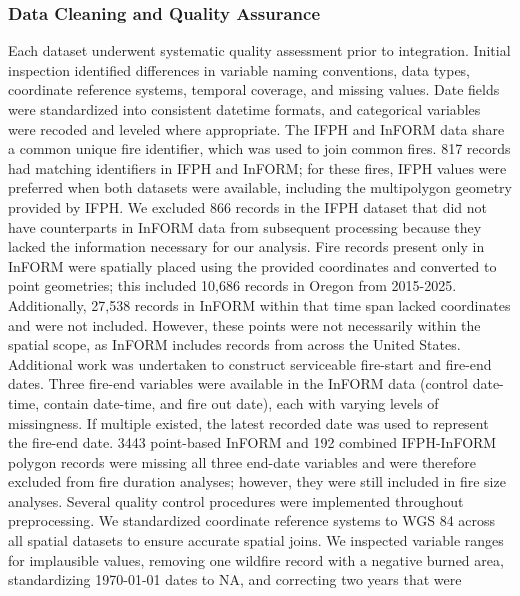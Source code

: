 \documentclass[
  letterpaper,
  DIV=11,
  numbers=noendperiod]{scrartcl}
\begin{document}
\subsubsection{Data Cleaning and Quality
Assurance}\label{data-cleaning-and-quality-assurance}

Each dataset underwent systematic quality assessment prior to
integration. Initial inspection identified differences in variable
naming conventions, data types, coordinate reference systems, temporal
coverage, and missing values. Date fields were standardized into
consistent datetime formats, and categorical variables were recoded and
leveled where appropriate. \hspace{0pt} The IFPH and InFORM data share a
common unique fire identifier, which was used to join common fires. 817
records had matching identifiers in IFPH and InFORM; for these fires,
IFPH values were preferred when both datasets were available, including
the multipolygon geometry provided by IFPH. We excluded 866 records in
the IFPH dataset that did not have counterparts in InFORM data from
subsequent processing because they lacked the information necessary for
our analysis. Fire records present only in InFORM were spatially placed
using the provided coordinates and converted to point geometries; this
included 10,686 records in Oregon from 2015-2025. Additionally, 27,538
records in InFORM within that time span lacked coordinates and were not
included. However, these points were not necessarily within the spatial
scope, as InFORM includes records from across the United States.
\hspace{0pt} Additional work was undertaken to construct serviceable
fire-start and fire-end dates. Three fire-end variables were available
in the InFORM data (control date-time, contain date-time, and fire out
date), each with varying levels of missingness. If multiple existed, the
latest recorded date was used to represent the fire-end date. 3443
point-based InFORM and 192 combined IFPH-InFORM polygon records were
missing all three end-date variables and were therefore excluded from
fire duration analyses; however, they were still included in fire size
analyses. \hspace{0pt} Several quality control procedures were
implemented throughout preprocessing. We standardized coordinate
reference systems to WGS 84 across all spatial datasets to ensure
accurate spatial joins. We inspected variable ranges for implausible
values, removing one wildfire record with a negative burned area,
standardizing 1970-01-01 dates to NA, and correcting two years that were
\end{document}
